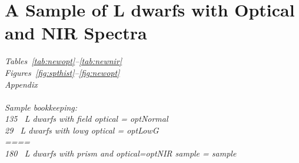 \documentclass[12pt,preprint]{aastex}
\newcommand{\sample}{180}
\newcommand{\optNormal}{135}
\newcommand{\optLowG}{29}
\newcommand{\optNoisy}{13}
\newcommand{\optPec}{35}
\begin{document}
% 

\clearpage
\section{A Sample of L dwarfs with Optical and NIR Spectra}
\label{sec:sample}

\emph{
Tables~\ref{tab:newopt}--\ref{tab:newnir}\\
Figures~\ref{fig:spthist}--\ref{fig:newopt}\\
Appendix\\
\\
Sample bookkeeping:\\
\optNormal~ L dwarfs with field optical =  \emph{optNormal}\\
\optLowG~ L dwarfs with lowg optical = \emph{optLowG} \\
====\\
\sample~ L dwarfs with prism and optical=optNIR sample = \emph{sample}\\
}
\end{document}

